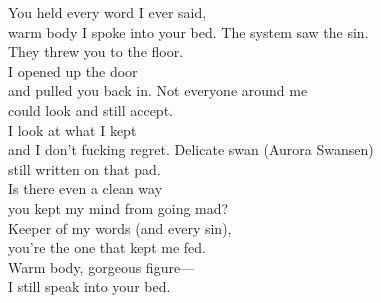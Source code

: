 \begin{lyrics}
You held every word I ever said,\\
warm body I spoke into your bed.
The system saw the sin.\\
They threw you to the floor.\\
I opened up the door\\
and pulled you back in.
Not everyone around me\\
could look and still accept.\\
I look at what I kept\\
and I don’t fucking regret.
Delicate swan (Aurora Swansen)\\
still written on that pad.\\
Is there even a clean way\\
you kept my mind from going mad?\\
Keeper of my words (and every sin),\\
you’re the one that kept me fed.\\
Warm body, gorgeous figure—\\
I still speak into your bed.
\end{lyrics}

